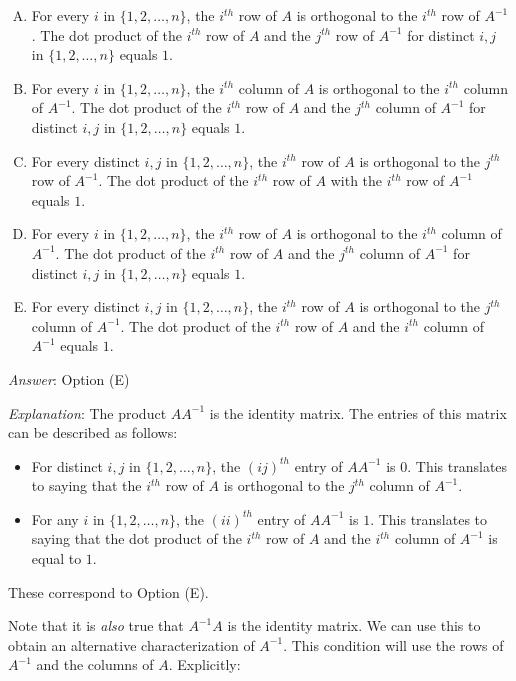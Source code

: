 \documentclass[10pt]{amsart}
\begin{document}
\begin{enumerate}
  \begin{enumerate}[(A)]
  \item For every $i$ in $\{ 1,2,\dots,n\}$, the $i^{th}$ row of $A$ is
    orthogonal to the $i^{th}$ row of $A^{-1}$. The dot product of the
    $i^{th}$ row of $A$ and the $j^{th}$ row of $A^{-1}$ for distinct
    $i,j$ in $\{1,2,\dots,n\}$ equals $1$.
  \item For every $i$ in $\{ 1,2,\dots,n\}$, the $i^{th}$ column of $A$ is
    orthogonal to the $i^{th}$ column of $A^{-1}$. The dot product of the
    $i^{th}$ row of $A$ and the $j^{th}$ column of $A^{-1}$ for distinct
    $i,j$ in $\{1,2,\dots,n\}$ equals $1$.
 \item For every distinct $i,j$ in $\{1,2,\dots,n\}$, the $i^{th}$ row
   of $A$ is orthogonal to the $j^{th}$ row of $A^{-1}$. The dot
   product of the $i^{th}$ row of $A$ with the $i^{th}$ row of
   $A^{-1}$ equals $1$.
   \item For every $i$ in $\{ 1,2,\dots,n\}$, the $i^{th}$ row of $A$ is
    orthogonal to the $i^{th}$ column of $A^{-1}$. The dot product of the
    $i^{th}$ row of $A$ and the $j^{th}$ column of $A^{-1}$ for distinct
    $i,j$ in $\{1,2,\dots,n\}$ equals $1$.
  \item For every distinct $i,j$ in $\{1,2,\dots,n\}$, the $i^{th}$
    row of $A$ is orthogonal to the $j^{th}$ column of $A^{-1}$. The
    dot product of the $i^{th}$ row of $A$ and the $i^{th}$ column of
    $A^{-1}$ equals $1$.
  \end{enumerate}

  {\em Answer}: Option (E)

  {\em Explanation}: The product $AA^{-1}$ is the identity matrix. The
  entries of this matrix can be described as follows:

  \begin{itemize}
  \item For distinct $i,j$ in $\{ 1,2,\dots,n \}$, the $(ij)^{th}$
    entry of $AA^{-1}$ is $0$. This translates to saying that the
    $i^{th}$ row of $A$ is orthogonal to the $j^{th}$ column of
    $A^{-1}$.
  \item For any $i$ in $\{ 1,2,\dots, n\}$, the $(ii)^{th}$ entry of
    $AA^{-1}$ is $1$. This translates to saying that the dot product of
    the $i^{th}$ row of $A$ and the $i^{th}$ column of $A^{-1}$ is
    equal to $1$.
  \end{itemize}

  These correspond to Option (E).

  Note that it is {\em also} true that $A^{-1}A$ is the identity
  matrix. We can use this to obtain an alternative characterization of
  $A^{-1}$. This condition will use the rows of $A^{-1}$ and the
  columns of $A$. Explicitly:


\end{enumerate}
\end{document}
